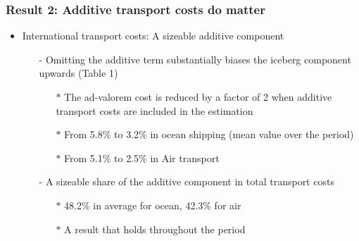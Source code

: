 \documentclass[10 pt,Helvetica, french]{beamer}
\begin{document}
\begin{frame}[label=slide_result2]
\frametitle{Result 2: Additive transport costs do matter}
\begin{itemize}
\item International transport costs: A sizeable additive component  \vspace{0.2cm}
\begin{itemize}
\item[-] Omitting the additive term substantially biases the iceberg component upwards (Table 1) \vspace{0.2cm}
\begin{itemize}
\item[$\ast$] The ad-valorem cost is reduced by a factor of 2 when additive transport costs are included in the estimation  \vspace{0.2cm}
\item[$\ast$] From 5.8\% to 3.2\% in ocean shipping (mean value over the period) \vspace{0.2cm}
\item[$\ast$] From 5.1\% to 2.5\% in Air transport \vspace{0.2cm}
\end{itemize}
\item[-] A sizeable share of the additive component in total transport costs \vspace{0.2cm}
\begin{itemize}
\item[$\ast$] 48.2\% in average for ocean, 42.3\% for air  \vspace{0.2cm}
\item[$\ast$] A result that holds throughout the period \hyperlink{slide_fig1}{} \vspace{0.1cm}
\end{itemize}
\end{itemize}
\end{itemize}
\end{frame}
\end{document}
